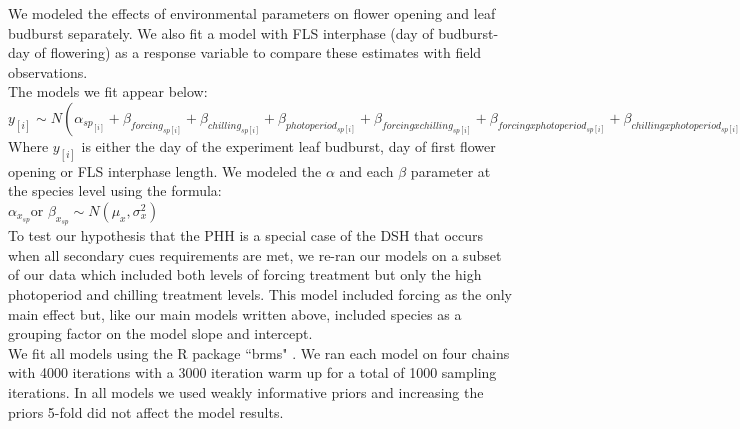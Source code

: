 \documentclass[11pt]{article}
\begin{document}
\noident We modeled the effects of environmental parameters on flower opening and leaf budburst separately. We also fit a model with FLS interphase (day of budburst- day of flowering) as a response variable to compare these estimates with field observations.\\

The models we fit appear below:\\

$y_{[i]} \sim N(\alpha_{sp_{[i]}}+\beta_{forcing_{sp[i]}}+\beta_{chilling_{sp[i]}}+\beta_{photoperiod_{sp[i]}}+\beta_{forcing x chilling_{sp[i]}}+\beta_{forcing x photoperiod_{sp[i]}}+\beta_{chilling x photoperiod_{sp[i]}})$\\

Where $y_{[i]}$ is either the day of the experiment leaf budburst, day of first flower opening or FLS interphase length.  We modeled the $\alpha$ and each $\beta$ parameter at the species level using the formula:\\

$\alpha_{x_{sp}} $or $\beta_{x_{sp}} \sim N(\mu_x,\sigma^2_x)$\\

\noindent To test our hypothesis that the PHH is a special case of the DSH that occurs when all secondary cues requirements are met, we re-ran our models on a subset of our data which included both levels of forcing treatment but only the high photoperiod and chilling treatment levels. This model included forcing as the only main effect but, like our main models written above, included species as a grouping factor on the model slope and intercept.\\ 

\noindent We fit all models using the R package ``brms" \citep{Burkner2018}. We ran each model on four chains with 4000 iterations with a 3000 iteration warm up for a total of 1000 sampling iterations. In all models we used weakly informative priors and increasing the priors 5-fold did not affect the model results.\\ %

\end{document}
